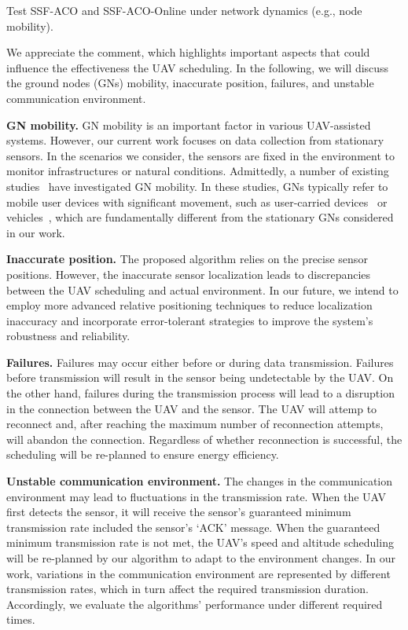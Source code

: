 \begin{metacomment}
	Test SSF-ACO and SSF-ACO-Online under network dynamics (e.g., node mobility).
\end{metacomment}
\begin{metaresponse}
	We appreciate the comment, which highlights important aspects that could influence the effectiveness the UAV scheduling.
	In the following, we will discuss the ground nodes (GNs) mobility, inaccurate position, failures, and unstable communication environment.

	\textbf{GN mobility.}
	GN mobility is an important factor in various UAV-assisted systems.
	However, our current work focuses on data collection from stationary sensors.
	In the scenarios we consider, the sensors are fixed in the environment to monitor infrastructures or natural conditions.
	Admittedly, a number of existing studies~\cite{GNmob1, GNmob2, GNmob3, GNmob4} have investigated GN mobility.
	In these studies, GNs typically refer to mobile user devices with significant movement, such as user-carried devices~\cite{GNmob1,GNmob2} or vehicles~\cite{GNmob3,GNmob4}, which are fundamentally different from the stationary GNs considered in our work.

	\textbf{Inaccurate position.}
	The proposed algorithm relies on the precise sensor positions.
	However, the inaccurate sensor localization leads to discrepancies between the UAV scheduling and actual environment.
	In our future, we intend to employ more advanced relative positioning techniques to reduce localization inaccuracy and incorporate error-tolerant strategies to improve the system's robustness and reliability.

	\textbf{Failures.}
	Failures may occur either before or during data transmission.
	Failures before transmission will result in the sensor being undetectable by the UAV.
	On the other hand, failures during the transmission process will lead to a disruption in the connection between the UAV and the sensor.
	The UAV will attemp to reconnect and, after reaching the maximum number of reconnection attempts, will abandon the connection.
	Regardless of whether reconnection is successful, the scheduling will be re-planned to ensure energy efficiency.

	\textbf{Unstable communication environment.}
	The changes in the communication environment may lead to fluctuations in the transmission rate.
	When the UAV first detects the sensor, it will receive the sensor's guaranteed minimum transmission rate included the sensor's `ACK' message.
	When the guaranteed minimum transmission rate is not met, the UAV's speed and altitude scheduling will be re-planned by our algorithm to adapt to the environment changes.
	In our work, variations in the communication environment are represented by different transmission rates, which in turn affect the required transmission duration. Accordingly, we evaluate the algorithms' performance under different required times.


\end{metaresponse}
